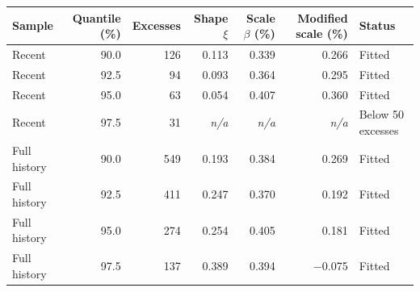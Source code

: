 \begin{tabular}{@{}lrrrrrl@{}}
\toprule
Sample & Quantile (\%) & Excesses & Shape $\xi$ & Scale $\beta$ (\%) & Modified scale (\%) & Status \\
\midrule
Recent & 90.0 & 126 & 0.113 & 0.339 & 0.266 & Fitted \\
Recent & 92.5 & 94 & 0.093 & 0.364 & 0.295 & Fitted \\
Recent & 95.0 & 63 & 0.054 & 0.407 & 0.360 & Fitted \\
Recent & 97.5 & 31 & \textit{n/a} & \textit{n/a} & \textit{n/a} & Below 50 excesses \\
\midrule
Full history & 90.0 & 549 & 0.193 & 0.384 & 0.269 & Fitted \\
Full history & 92.5 & 411 & 0.247 & 0.370 & 0.192 & Fitted \\
Full history & 95.0 & 274 & 0.254 & 0.405 & 0.181 & Fitted \\
Full history & 97.5 & 137 & 0.389 & 0.394 & −0.075 & Fitted \\
\bottomrule
\end{tabular}
